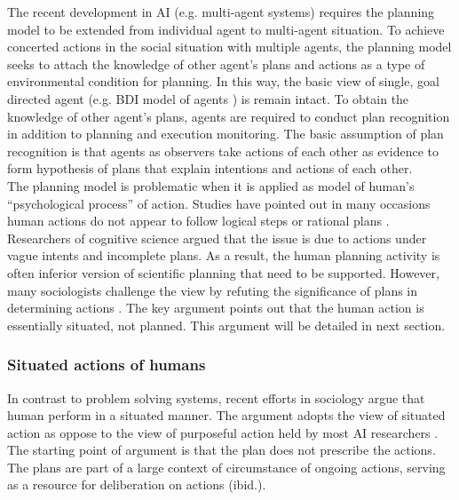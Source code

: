 The recent development in \ac{AI} (e.g. multi-agent systems) requires the planning model to be extended from individual agent to multi-agent situation. To achieve concerted actions in the social situation with multiple agents, the planning model seeks to attach the knowledge of other agent's plans and actions as a type of environmental condition for planning. In this way, the basic view of single, goal directed agent (e.g. BDI model of agents \cite{Georgeff1999}) is remain intact. To obtain the knowledge of other agent's plans, agents are required to conduct plan recognition in addition to planning and execution monitoring. The basic assumption of plan recognition is that agents as observers take actions of each other as evidence to form hypothesis of plans that explain intentions and actions of each other.  \\

The planning model is problematic when it is applied as model of human's ``psychological process'' of action. Studies have pointed out in many occasions human actions do not appear to follow logical steps or rational plans \cite{Suchman1987}. Researchers of cognitive science argued that the issue is due to actions under vague intents and incomplete plans. As a result, the human planning activity is often inferior version of scientific planning that need to be supported. However, many sociologists challenge the view by refuting the significance of plans in determining actions  \cite{Suchman1987}. The key argument points out that the human action is essentially situated, not planned. This argument will be detailed in next section.\\ 

\subsubsection{Situated actions of humans}
In contrast to problem solving systems, recent efforts in sociology argue that human perform in a situated manner. The argument adopts the view of situated action as oppose to the view of purposeful action held by most \ac{AI} researchers \cite{Suchman1987}. The starting point of argument is that the plan does not prescribe the actions. The plans are part of a large context of circumstance of ongoing actions, serving as a resource for deliberation on actions (ibid.).\\

